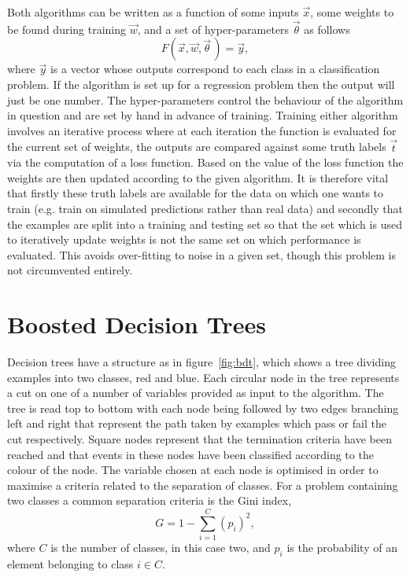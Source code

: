 Both algorithms can be written as a function of some inputs $\vec{x}$, some
weights to be found during training $\vec{w}$, and a set of hyper-parameters
$\vec{\theta}$ as follows
\begin{equation}
  F(\vec{x}, \vec{w}, \vec{\theta} \,) = \vec{y},
  \label{eq:ml-general}
\end{equation}
where $\vec{y}$ is a vector whose outputs correspond to each class in a
classification problem. If the algorithm is set up for a regression problem then
the output will just be one number. The hyper-parameters control the behaviour
of the algorithm in question and are set by hand in advance of training.
Training either algorithm involves an iterative process where at each iteration
the function is evaluated for the current set of weights, the outputs are
compared against some truth labels $\vec{t}$ via the computation of a loss
function. Based on the value of the loss function the weights are then updated
according to the given algorithm. It is therefore vital that firstly these truth
labels are available for the data on which one wants to train (e.g. train on
simulated predictions rather than real data) and secondly that the examples are
split into a training and testing set so that the set which is used to
iteratively update weights is not the same set on which performance is
evaluated. This avoids over-fitting to noise in a given set, though this
problem is not circumvented entirely.

\section{Boosted Decision Trees}%
\label{sec:bdts}
Decision trees have a structure as in figure~\ref{fig:bdt}, which shows a tree
dividing examples into two classes, red and blue.
 Each circular node in the tree represents a cut
on one of a number of variables provided as input to the algorithm. The tree is
read top to bottom with each node being followed by two edges branching left and
right that represent the path taken by examples which pass or fail the cut
respectively. Square nodes represent that the termination criteria have been
reached and that events in these nodes have been classified according to the
colour of the node. The variable chosen at each node is optimised in order to
maximise a criteria related to the separation of classes. For a problem
containing two classes a common separation criteria is the Gini index,
\begin{equation} G = 1 - \sum_{i=1}^{C}(p_i)^2,
  \label{eq:gini}
\end{equation} where $C$ is the number of classes, in this case two, and $p_i$
is the probability of an element belonging to class $i \in C$.


